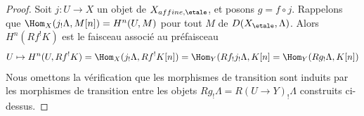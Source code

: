 \begin{proof}
Soit $j : U \to X$ un objet de $X_{affine, \etale}$, et posons $g = f \circ j$.
Rappelons que $\Hom_X(j_!\Lambda, M[n]) = H^n(U, M)$ pour tout $M$ de
$D(X_\etale, \Lambda)$. Alors $H^n(Rf^!K)$ est le faisceau associé au
préfaisceau
$$
U \mapsto H^n(U, Rf^!K) = \Hom_X(j_!\Lambda, Rf^!K[n]) =
\Hom_Y(Rf_!j_!\Lambda, K[n] = \Hom_Y(Rg_!\Lambda, K[n])
$$
Nous omettons la vérification que les morphismes de transition sont induits par les morphismes
de transition entre les objets $Rg_!\Lambda = R(U \to Y)_!\Lambda$ construits
ci-dessus.
\end{proof}






















